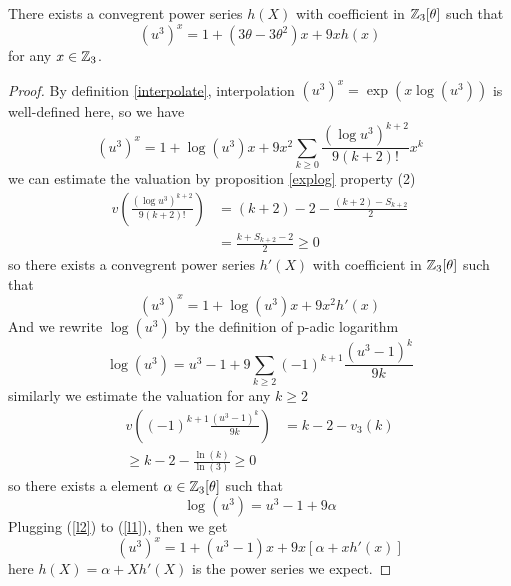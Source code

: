     \begin{lemma}
        There exists a convegrent power series \(h(X)\) with coefficient in \(\mathbb{Z}_3[\theta]\) such that
        \begin{equation} \label{eq1}
            (u^3)^x = 1 + (3\theta-3\theta^2)x+9xh(x)
         \end{equation}
        for any \(x \in \mathbb{Z}_3\).

        \begin{proof}
            By definition \ref{interpolate}, interpolation \((u^3)^x = \exp(x \log(u^3))\) is well-defined here, so we have
            \[(u^3)^x = 1+ \log(u^3)x + 9x^2 \sum_{k \geq 0} \frac{(\log u^3)^{k+2}}{9(k+2)!}x^k\]
            we can estimate the valuation by proposition \ref{explog} property (2)
            \begin{align*}
                v(\frac{(\log u^3)^{k+2}}{9(k+2)!}) &= (k+2)-2-\frac{(k+2)-S_{k+2}}{2} \\
                &= \frac{k+S_{k+2}-2}{2} \geq 0
            \end{align*}
            so there exists a convegrent power series \(h'(X)\) with coefficient in \(\mathbb{Z}_3[\theta]\) such that 
            \begin{equation} \label{l1}
                (u^3)^x = 1+ \log(u^3)x + 9x^2h'(x)
            \end{equation}
            And we rewrite \(\log(u^3)\) by the definition of p-adic logarithm
            \[\log(u^3) = u^3-1 + 9\sum_{k \geq 2} (-1)^{k+1}\frac{(u^3-1)^k}{9k}\]
            similarly we estimate the valuation for any \(k\geq 2\)
            \begin{align*}
                v((-1)^{k+1}\frac{(u^3-1)^k}{9k}) &= k-2-v_3(k) \\
                \geq k-2-\frac{\ln(k)}{\ln(3)} \geq 0
            \end{align*}
            so there exists a element \(\alpha \in \mathbb{Z}_3[\theta]\) such that
            \begin{equation} \label{l2}
                \log(u^3) = u^3-1 + 9\alpha
            \end{equation}
            Plugging (\ref{l2}) to (\ref{l1}), then we get
            \[(u^3)^x = 1+(u^3-1)x+9x[\alpha +xh'(x)]\]
            here \(h(X) = \alpha +Xh'(X)\) is the power series we expect.
        \end{proof}


    \end{lemma}

